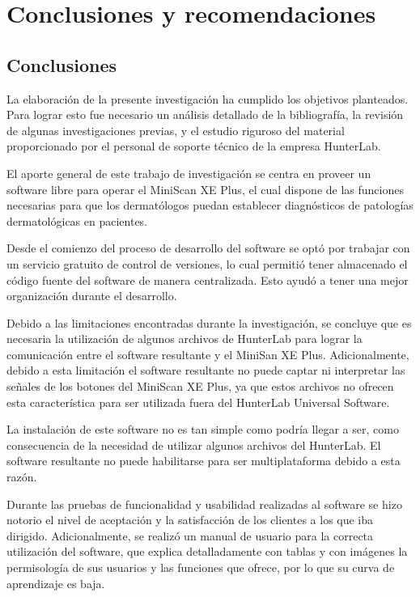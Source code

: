 \chapter{Conclusiones y recomendaciones}

\section{Conclusiones}

	La elaboraci\'{o}n de la presente investigaci\'{o}n ha cumplido los objetivos planteados. Para lograr esto fue necesario un an\'{a}lisis detallado de la bibliograf\'{i}a, la revisi\'{o}n de algunas investigaciones previas, y el estudio riguroso del material proporcionado por el personal de soporte t\'{e}cnico de la empresa HunterLab.
	
	El aporte general de este trabajo de investigaci\'{o}n se centra en proveer un software libre para operar el MiniScan XE Plus, el cual dispone de las funciones necesarias para que los dermat\'{o}logos puedan establecer diagn\'{o}sticos de patolog\'{i}as dermatol\'{o}gicas en pacientes.
	
	Desde el comienzo del proceso de desarrollo del software se opt\'{o} por trabajar con un servicio gratuito de control de versiones, lo cual permiti\'{o} tener almacenado el c\'{o}digo fuente del software de manera centralizada. Esto ayud\'{o} a tener una mejor organizaci\'{o}n durante el desarrollo.
	
	Debido a las limitaciones encontradas durante la investigaci\'{o}n, se concluye que es necesaria la utilizaci\'{o}n de algunos archivos de HunterLab para lograr la comunicaci\'{o}n entre el software resultante y el MiniSan XE Plus. Adicionalmente, debido a esta limitaci\'{o}n el software resultante no puede captar ni interpretar las se\~{n}ales de los botones del MiniScan XE Plus, ya que estos archivos no ofrecen esta caracter\'{i}stica para ser utilizada fuera del HunterLab Universal Software.
	
	La instalaci\'{o}n de este software no es tan simple como podr\'{i}a llegar a ser, como consecuencia de la necesidad de utilizar algunos archivos del HunterLab. El software resultante no puede habilitarse para ser multiplataforma debido a esta raz\'{o}n.

	Durante las pruebas de funcionalidad y usabilidad realizadas al software se hizo notorio el nivel de aceptaci\'{o}n y la satisfacci\'{o}n de los clientes a los que iba dirigido. Adicionalmente, se realiz\'{o} un manual de usuario para la correcta utilizaci\'{o}n del software, que explica detalladamente con tablas y con im\'{a}genes la permisolog\'{i}a de sus usuarios y las funciones que ofrece, por lo que su curva de aprendizaje es baja.
	
